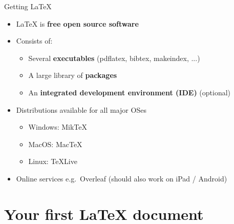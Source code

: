 \begin{frame}{Getting LaTeX}
\begin{itemize}
	\pause\item LaTeX is \textbf{free open source software}
	\pause\item Consists of:
	\begin{itemize}
		\pause\item Several \textbf{executables} (pdflatex, bibtex, makeindex, ...)
		\pause\item A large library of \textbf{packages}
		\pause\item An \textbf{integrated development environment (IDE)} (optional)
	\end{itemize}
	\pause\item Distributions available for all major OSes
	\begin{itemize}
		\item Windows: MikTeX
		\item MacOS: MacTeX
		\item Linux: TeXLive
	\end{itemize}
	\pause\item Online services e.g.\ Overleaf (should also work on iPad / Android)
\end{itemize}
\end{frame}

\part{Your first LaTeX document}
\frame{\partpage}
